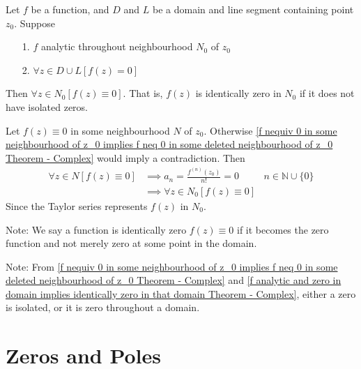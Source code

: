 \documentclass[12pt, english]{book}
\makeatletter
\renewenvironment{proof}[1][\proofname]{\par
	\pushQED{\qed}%
	\normalfont \topsep6\p@\@plus6\p@\relax
	\list{}{%
		\settowidth{\leftmargin}{\itshape\proofname:\hskip\labelsep}%
		\setlength{\labelwidth}{0pt}%
		\setlength{\itemindent}{-\leftmargin}%
	}%
	\item[\hskip\labelsep\itshape#1\@addpunct{:}]\ignorespaces
	}{ \popQED\endlist\@endpefalse}
\makeatother
\begin{document}
	\begin{theorem}
		\label{f analytic and zero in domain implies identically zero in that domain Theorem - Complex}
		Let \(f\) be a function, and \(D\) and \(L\) be a domain and line segment containing point \(z_0\). Suppose
		\begin{itemize}
			\item[1.] \(f\) analytic throughout neighbourhood \(N_0\) of \(z_0\)
			\item[2.] \(\forall z \in D\cup L [f(z) = 0]\)
		\end{itemize}
		Then \(\forall z \in N_0 [f(z) \equiv 0]\). That is, \(f(z)\) is identically zero in \(N_0\) if it does not have isolated zeros.
	\end{theorem}
	\begin{proof}
		Let \(f(z) \equiv 0\) in some neighbourhood \(N\) of \(z_0\). Otherwise \cref{f nequiv 0 in some neighbourhood of z_0 implies f neq 0 in some deleted neighbourhood of z_0 Theorem - Complex} would imply a contradiction. Then 
		\begin{align*}
			\forall z \in N [f(z) \equiv 0]
			&\implies a_n  = \frac{f^{(n)}(z_0)}{n!} = 0	&	n \in \mathbb{N} \cup \{0\} \\
			&\implies \forall z \in N_0 [f(z) \equiv 0]
		\end{align*}
		Since the Taylor series represents \(f(z)\) in \(N_0\).
	\end{proof}

	Note: We say a function is identically zero \(f(z) \equiv 0\) if it becomes the zero function and not merely zero at some point in the domain.
	
	Note: From \cref{f nequiv 0 in some neighbourhood of z_0 implies f neq 0 in some deleted neighbourhood of z_0 Theorem - Complex} and \cref{f analytic and zero in domain implies identically zero in that domain Theorem - Complex}, either a zero is isolated, or it is zero throughout a domain.
	
	\section{Zeros and Poles} \label{Zeros and Poles Section - Complex}
	
\end{document}
